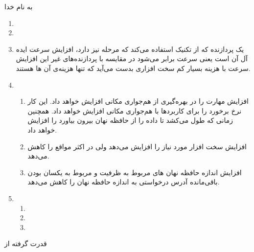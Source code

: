 \documentclass{article}[12pt]
\begin{document}
\begin{centering}
به نام خدا\\
\end{centering}
\begin{enumerate}
\item

\item
\item
یک پردازنده که از تکنیک 
استفاده می‌کند که 
مرحله نیز دارد، افزایش سرعت ایده آل آن 
است یعنی سرعت 
برابر می‌شود در مقایسه با پردازنده‌های غیر 
این افزایش سرعت با هزینه بسیار کم سخت افزاری بدست می‌آید که تنها هزینه‌ی آن 
ها هستند.
\item
\begin{enumerate}
\item
افزایش 
مهارت
را در بهره‌گیری از هم‌جواری مکانی افزایش خواهد داد. این کار نرخ برخورد را برای کاربرد‌ها با هم‌جواری مکانی افزایش خواهد داد. همچنین زمانی که طول می‌کشد تا داده را از حافظه نهان بیرون بیاورد را افزایش خواهد داد.
\item
افزایش 
سخت افزار مورد نیاز را افزایش می‌دهد ولی در اکثر مواقع 
را کاهش می‌دهد.
\item
افزایش اندازه حافظه نهان 
های مربوط به ظرفیت و مربوط به یکسان بودن باقی‌مانده آدرس درخواستی به اندازه حافظه نهان را کاهش می‌دهد.
\end{enumerate}
\item
\begin{enumerate}
\item
{}
\item
{}
\item
{}
\end{enumerate}
\end{enumerate}
\begin{centering}
قدرت گرفته از \lr{\LaTeX}

\end{centering}
\end{document}
